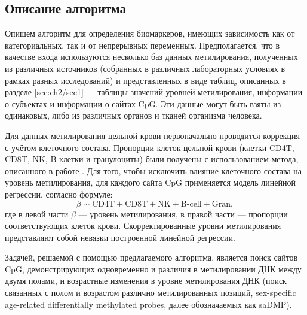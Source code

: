 \subsection{Описание алгоритма}\label{subsec:ch2/sec2/subsec1}

Опишем алгоритм для определения биомаркеров, имеющих зависимость как от категориальных, так и от непрерывных переменных. Предполагается, что в качестве входа используются несколько баз данных метилирования, полученных из различных источников (собранных в различных лабораторных условиях в рамках разных исследований) и представленных в виде таблиц, описанных в разделе \ref{sec:ch2/sec1} --- таблицы значений уровней метилирования, информации о субъектах и информации о сайтах CpG. Эти данные могут быть взяты из одинаковых, либо из различных органов и тканей организма человека. 

Для данных метилирования цельной крови первоначально проводится коррекция с учётом клеточного состава. Пропорции клеток цельной крови (клетки CD4T, CD8T, NK, B-клетки и гранулоциты) были получены с использованием метода, описанного в работе \autocite{Horvath2013}. Для того, чтобы исключить влияние клеточного состава на уровень метилирования, для каждого сайта CpG применяется модель линейной регрессии, согласно формуле:
\begin{equation}
\label{eq:cell_correction}
\beta \sim \text{CD4T} + \text{CD8T} + \text{NK} + \text{B-cell} + \text{Gran},
\end{equation}
где в левой части $\beta$ --- уровень метилирования, в правой части --- пропорции соответствующих клеток крови. Скорректированные уровни метилирования представляют собой невязки построенной линейной регрессии.

Задачей, решаемой с помощью предлагаемого алгоритма, является поиск сайтов CpG, демонстрирующих одновременно и различия в метилировании ДНК между двумя полами, и возрастные изменения в уровне метилирования ДНК (поиск связанных с полом и возрастом различно метилированных позиций, sex-specific age-related differentially methylated probes, далее обозначаемых как saDMP). 

